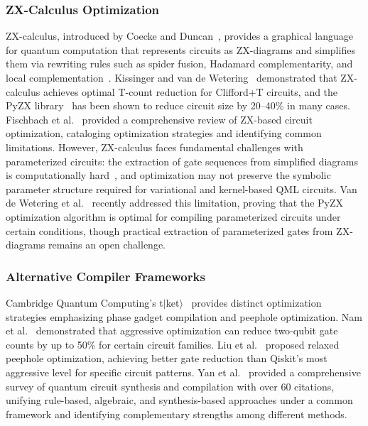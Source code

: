 \documentclass{ieeeaccess}
\begin{document}
\subsubsection{ZX-Calculus Optimization}
ZX-calculus, introduced by Coecke and Duncan~\cite{Coecke2011}, provides a graphical language for quantum computation that represents circuits as ZX-diagrams and simplifies them via rewriting rules such as spider fusion, Hadamard complementarity, and local complementation~\cite{vandeWetering2020}. Kissinger and van de Wetering~\cite{Kissinger2020} demonstrated that ZX-calculus achieves optimal T-count reduction for Clifford+T circuits, and the PyZX library~\cite{Kissinger2019} has been shown to reduce circuit size by 20--40\% in many cases. Fischbach et al.~\cite{Fischbach2025} provided a comprehensive review of ZX-based circuit optimization, cataloging optimization strategies and identifying common limitations. However, ZX-calculus faces fundamental challenges with parameterized circuits: the extraction of gate sequences from simplified diagrams is computationally hard~\cite{deBeaudrap2020}, and optimization may not preserve the symbolic parameter structure required for variational and kernel-based QML circuits. Van de Wetering et al.~\cite{vandeWetering2025} recently addressed this limitation, proving that the PyZX optimization algorithm is optimal for compiling parameterized circuits under certain conditions, though practical extraction of parameterized gates from ZX-diagrams remains an open challenge.

\subsubsection{Alternative Compiler Frameworks}
Cambridge Quantum Computing's t$|$ket$\rangle$~\cite{Sivarajah2020} provides distinct optimization strategies emphasizing phase gadget compilation and peephole optimization. Nam et al.~\cite{Nam2018} demonstrated that aggressive optimization can reduce two-qubit gate counts by up to 50\% for certain circuit families. Liu et al.~\cite{Liu2021} proposed relaxed peephole optimization, achieving better gate reduction than Qiskit's most aggressive level for specific circuit patterns. Yan et al.~\cite{Yan2024} provided a comprehensive survey of quantum circuit synthesis and compilation with over 60 citations, unifying rule-based, algebraic, and synthesis-based approaches under a common framework and identifying complementary strengths among different methods.
\end{document}
